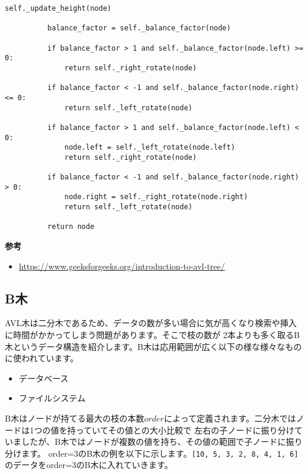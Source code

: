 \begin{lstlisting}[caption=二分ヒープの実装, label=binaryheap, frame=TRBL, label={binaryheap}]
          self._update_height(node)
          
          balance_factor = self._balance_factor(node)
          
          if balance_factor > 1 and self._balance_factor(node.left) >= 0:
              return self._right_rotate(node)
          
          if balance_factor < -1 and self._balance_factor(node.right) <= 0:
              return self._left_rotate(node)
          
          if balance_factor > 1 and self._balance_factor(node.left) < 0:
              node.left = self._left_rotate(node.left)
              return self._right_rotate(node)
          
          if balance_factor < -1 and self._balance_factor(node.right) > 0:
              node.right = self._right_rotate(node.right)
              return self._left_rotate(node)
          
          return node
  \end{lstlisting}

\textbf{参考}
\begin{itemize}
  \item \url{https://www.geeksforgeeks.org/introduction-to-avl-tree/}
\end{itemize}

\newpage
\subsection{B木}
AVL木は二分木であるため、データの数が多い場合に気が高くなり検索や挿入に時間がかかってしまう問題があります。そこで枝の数が
2本よりも多く取るB木というデータ構造を紹介します。B木は応用範囲が広く以下の様な様々なものに使われています。

\begin{itemize}
  \item データベース
  \item ファイルシステム
\end{itemize}

B木はノードが持てる最大の枝の本数$order$によって定義されます。二分木ではノードは1つの値を持っていてその値との大小比較で
左右の子ノードに振り分けていましたが、B木ではノードが複数の値を持ち、その値の範囲で子ノードに振り分けます。
order=$3$のB木の例を以下に示します。\texttt{[10, 5, 3, 2, 8, 4, 1, 6]}
のデータをorder=$3$のB木に入れていきます。

\vspace{0.5cm}

\begin{center}
\end{center}

